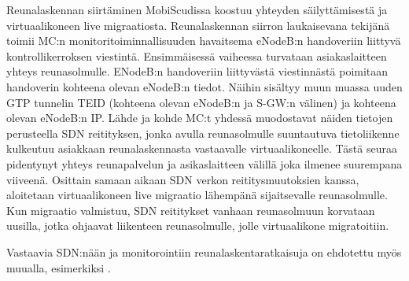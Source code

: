 Reunalaskennan siirtäminen MobiScudissa koostuu yhteyden säilyttämisestä ja virtuaalikoneen live migraatiosta.
Reunalaskennan siirron laukaisevana tekijänä toimii MC:n monitoritoiminnallisuuden havaitsema eNodeB:n handoveriin liittyvä kontrollikerroksen viestintä.
Ensimmäisessä vaiheessa turvataan asiakaslaitteen yhteys reunasolmulle. 
ENodeB:n handoveriin liittyvästä viestinnästä poimitaan handoverin kohteena olevan eNodeB:n tiedot.
Näihin sisältyy muun muassa uuden GTP tunnelin TEID (kohteena olevan eNodeB:n ja S-GW:n välinen) ja kohteena olevan eNodeB:n IP.
Lähde ja kohde MC:t yhdessä muodostavat näiden tietojen perusteella SDN reitityksen, jonka avulla reunasolmulle suuntautuva tietoliikenne kulkeutuu asiakkaan reunalaskennasta vastaavalle virtuaalikoneelle. Tästä seuraa pidentynyt yhteys reunapalvelun ja asikaslaitteen välillä joka ilmenee suurempana viiveenä. 
Osittain samaan aikaan SDN verkon reititysmuutoksien kanssa, aloitetaan virtuaalikoneen live migraatio lähempänä sijaitsevalle reunasolmulle.
Kun migraatio valmistuu, SDN reititykset vanhaan reunasolmuun korvataan uusilla, jotka ohjaavat liikenteen reunasolmulle, jolle virtuaalikone migratoitiin.

Vastaavia SDN:nään ja monitorointiin reunalaskentaratkaisuja on ehdotettu myös muualla, esimerkiksi \cite{schiller2018cds}.

